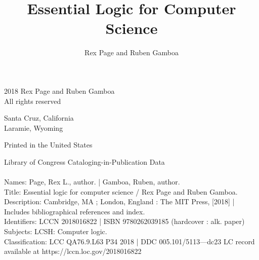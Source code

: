 \title{Essential Logic for Computer Science}
\author{Rex Page and Ruben Gamboa}


\halftitlepage
\clearpage





\titlepage


\begin{copyrightpage}
\textcopyright{} 2018 Rex Page and Ruben Gamboa \\
All rights reserved

Santa Cruz, California\\
Laramie, Wyoming

Printed in the United States

Library of Congress Cataloging-in-Publication Data\\
 \\
Names: Page, Rex L., author. | Gamboa, Ruben, author.\\
Title: Essential logic for computer science / Rex Page and Ruben Gamboa.\\
Description: Cambridge, MA ; London, England : The MIT Press, [2018] | \\
\hspace*{5mm}Includes bibliographical references and index.\\
Identifiers: LCCN 2018016822 | ISBN 9780262039185 (hardcover : alk. paper)\\
Subjects:  LCSH: Computer logic.\\
Classification: LCC QA76.9.L63 P34 2018 | DDC 005.101/5113—dc23 LC record available at https://lccn.loc.gov/2018016822
\end{copyrightpage}

